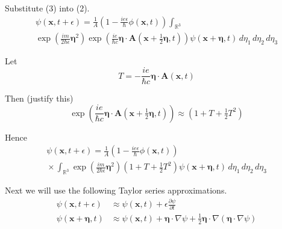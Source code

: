 \documentclass[12pt]{article}
\newcommand\INT{\int_{\mathbb R^3}}
\begin{document}
Substitute (3) into (2).
\begin{multline*}
\psi(\mathbf x,t+\epsilon)=
\frac{1}{A}\left(1-\frac{ie\epsilon}{\hbar}\phi\left(\mathbf x,t\right)\right)\INT
\\
\exp\left(\frac{im}{2\hbar\epsilon}\boldsymbol\eta^2\right)
\exp\left(\frac{ie}{\hbar c}\boldsymbol\eta\cdot\mathbf A\left(\mathbf x+\tfrac{1}{2}\boldsymbol\eta,t\right)\right)
\psi(\mathbf x+\boldsymbol\eta,t)
\,d\eta_1\,d\eta_2\,d\eta_3
\end{multline*}


Let
\begin{equation*}
T=-\frac{ie}{\hbar c}\boldsymbol\eta\cdot\mathbf A(\mathbf x,t)
\end{equation*}

Then (justify this)
\begin{equation*}
\exp\left(\frac{ie}{\hbar c}\boldsymbol\eta\cdot\mathbf A\left(\mathbf x+\tfrac{1}{2}\boldsymbol\eta,t\right)\right)
\approx
\left(1+T+\tfrac{1}{2}T^2\right)
\end{equation*}

Hence
\begin{multline*}
\psi(\mathbf x,t+\epsilon)=
\frac{1}{A}
\left(1-\frac{ie\epsilon}{\hbar}\phi\left(\mathbf x,t\right)\right)
\\
{}\times\INT\exp\left(\frac{im}{2\hbar\epsilon}\boldsymbol\eta^2\right)
\left(1+T+\tfrac{1}{2}T^2\right)
\psi(\mathbf x+\boldsymbol\eta,t)
\,d\eta_1\,d\eta_2\,d\eta_3
\tag{4}
\end{multline*}

Next we will use the following Taylor series approximations.
\begin{equation*}
\begin{aligned}
\psi(\mathbf x,t+\epsilon)&\approx\psi(\mathbf x,t)+\epsilon\frac{\partial\psi}{\partial t}
\\
\psi(\mathbf x+\boldsymbol\eta,t)&\approx\psi(\mathbf x,t)+\boldsymbol\eta\cdot\nabla\psi
+\tfrac{1}{2}\boldsymbol\eta\cdot\nabla(\boldsymbol\eta\cdot\nabla\psi)
\end{aligned}
\tag{5}
\end{equation*}
\end{document}
